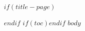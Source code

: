 \documentclass[11pt,twoside,openright]{memoir}
\date{}
\begin{document}
$if(title-page)$\maketitle$endif$
$if(toc)$\tableofcontents*$endif$
$body$
\end{document}
